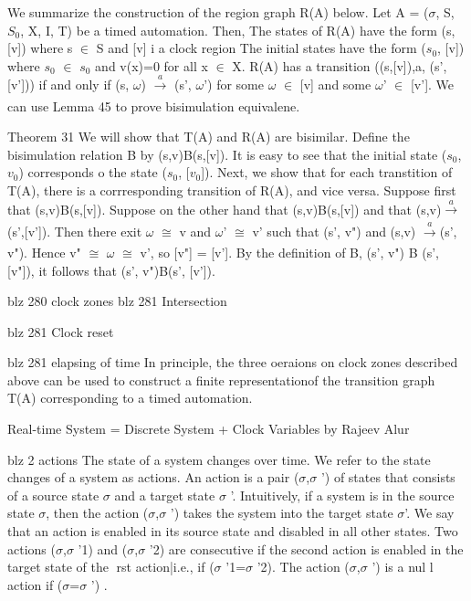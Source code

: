We summarize the construction of the region graph R(A) below. Let A = ($\sigma$, S, $S_0$, X, I, T) be a timed automation. Then,
The states of R(A) have the form (s, [v]) where s $\in$ S and [v] i a clock region
The initial states have the form ($s_0$, [v]) where $s_0$ $\in$ $s_0$ and v(x)=0 for all x $\in$ X.
R(A) has a transition ((s,[v]),a, (s',[v'])) if and only if (s, $\omega$)  $\xrightarrow[]{a}$  (s', $\omega$') for some $\omega$ $\in$ [v] and some $\omega$' $\in$ [v'].
 We can use Lemma 45 to prove bisimulation equivalene.

Theorem 31
We will show that T(A) and R(A) are bisimilar. Define the bisimulation relation B by (s,v)B(s,[v]). It is easy to see that the initial state ($s_0$, $v_0$) corresponds o the  state ($s_0$, [$v_0$]). Next, we show that for each transtition of T(A), there is a corrresponding transition  of R(A), and vice versa. Suppose first that (s,v)B(s,[v]). Suppose on the other hand that (s,v)B(s,[v]) and that  (s,v)$\xrightarrow[]{a}$(s',[v']). Then there exit $\omega$ $\cong$ v and $\omega$' $\cong$ v' such that (s', v") and (s,v) $\xrightarrow[]{a}$(s', v"). Hence v" $\cong$ $\omega$ $\cong$ v', so [v"] = [v']. By the definition of B, (s', v")
B (s', [v"]), it follows that (s', v")B(s', [v']).




blz 280 clock zones
blz 281 Intersection

blz 281 Clock reset


blz 281 elapsing of time
In principle, the three oeraions on clock zones described above can be used to construct a finite representationof the transition graph T(A) corresponding to a timed automation.


Real-time System = Discrete System + Clock Variables by Rajeev Alur

blz 2 actions
The state of a system changes over time. We refer to the state changes of a
system as actions. An action is a pair ($\sigma$,$\sigma$ ') of states that consists of a source
state $\sigma$ and a target state $\sigma$ '. Intuitively, if a system is in the source state $\sigma$,
then the action ($\sigma$,$\sigma$ ') takes the system into the target state $\sigma$'. We say that
an action is enabled in its source state and disabled in all other states. Two
actions ($\sigma$,$\sigma$ '1) and ($\sigma$,$\sigma$ '2) are consecutive if the second action is enabled in
the target state of the rst action|i.e., if ($\sigma$ '1=$\sigma$ '2). The action ($\sigma$,$\sigma$ ') is a nul l
action if ($\sigma$=$\sigma$ ')
.

